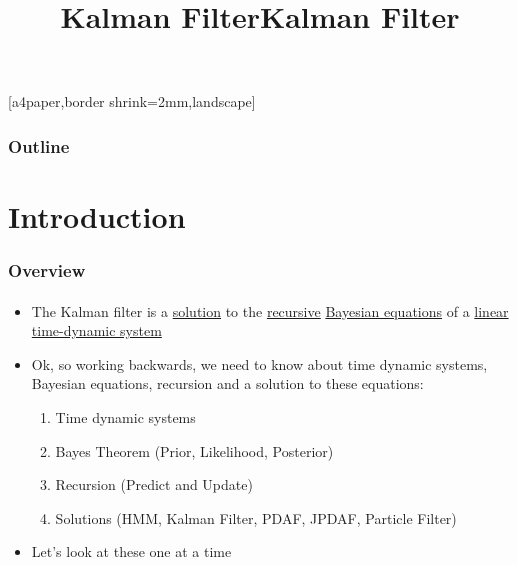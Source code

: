 

\title{Kalman Filter}


\mypagenum{}
{
	[a4paper,border shrink=2mm,landscape] 
}
{
}


\begin{frame}[plain]
\title{Kalman Filter}
\titlepage
\end{frame}



\begin{frame}\mypagenum
\frametitle{Outline}
\setcounter{tocdepth}{2}	
\tableofcontents
\end{frame}




\section{Introduction}
\begin{frame}
\frametitle{Overview}
\framesubtitle{}
\mypagenum
\begin{itemize}
\item The Kalman filter is a \underline{solution} to the \underline{recursive} \underline{Bayesian equations} of a \underline{linear time-dynamic system}
\item Ok, so working backwards, we need to know about time dynamic systems, Bayesian equations, recursion and a solution to these equations:
\begin{enumerate}
\item Time dynamic systems
\item Bayes Theorem (Prior, Likelihood, Posterior)
\item Recursion (Predict and Update)
\item Solutions (HMM, Kalman Filter, PDAF, JPDAF, Particle Filter)
\end{enumerate}
\item Let's look at these one at a time
\end{itemize}
\end{frame}





